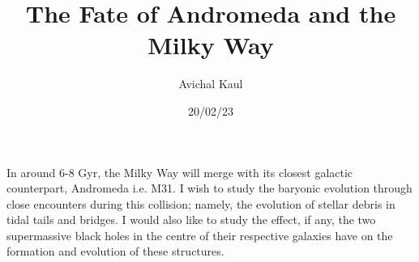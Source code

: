 \documentclass{article}
\title{The Fate of Andromeda and the Milky Way}
\author{Avichal Kaul}
\date{20/02/23}
\begin{document}
  \maketitle
  In around 6-8 Gyr, the Milky Way will merge with its closest galactic counterpart, Andromeda i.e. M31. I wish to study the baryonic evolution through close encounters during this collision; namely, the evolution of stellar debris in tidal tails and bridges. I would also like to study the effect, if any, the two supermassive black holes in the centre of their respective galaxies have on the formation and evolution of these structures.
\end{document}
